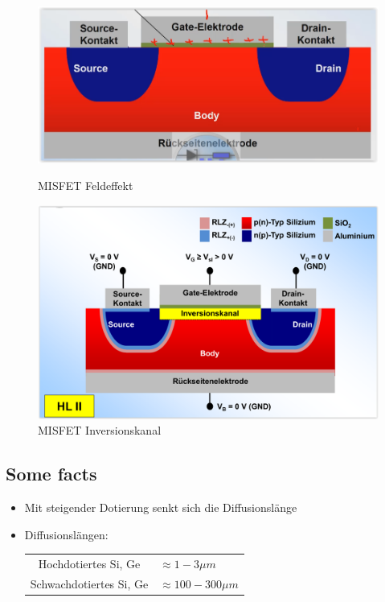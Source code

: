 \documentclass[12pt,a4paper]{report}%
\numberwithin{equation}{section}
\numberwithin{equation}{subsection}
\begin{document}
   \begin{figure}[H] 
				\centering
				\begin{minipage}{.5\textwidth}
				  \centering
				  \captionsetup{justification=centering}
		      \includegraphics[width=1.05\linewidth]{misfet_feldeffekt_a.png}
		      \caption{MISFET Feldeffekt \protect\cite{MIKRO2}}
		      \label{fig:misfet_feldeffekt_a}
				\end{minipage}%
				\begin{minipage}{.5\textwidth}
				  \centering
				  \captionsetup{justification=centering}
				  \includegraphics[width=0.77\linewidth]{misfet_inversionskanal.png}
				  \caption{MISFET Inversionskanal \protect\cite{MIKRO2}}
				  \label{fig:misfet_inversionskanal}
				\end{minipage}%
		  \end{figure}
		  
   \subsection{Some facts}
   \begin{itemize}
     \item Mit steigender Dotierung senkt sich die Diffusionslänge
     \item Diffusionslängen:
	     \begin{table}[H]
		     \centering
		     \begin{tabular}{c | l}
		       Hochdotiertes Si, Ge & $\approx 1-3\mu m$ \\
		       Schwachdotiertes Si, Ge & $\approx 100-300\mu m$ 
		     \end{tabular}
	     \end{table}
   \end{itemize}
\newpage	
\end{document}
